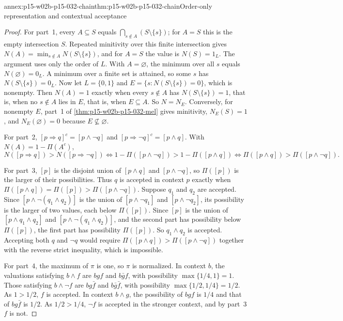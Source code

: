 \begin{annexitem}{annex:p15-w02b-p15-032-chain}{thm:p15-w02b-p15-032-chain}{Order-only representation and contextual acceptance}
\begin{proof}
For part~1, every \(A\subseteq S\) equals
\(\bigcap_{s\notin A}(S\setminus\{s\})\); for \(A=S\) this is the empty
intersection \(S\). Repeated minitivity over this finite intersection gives
\(N(A)=\min_{s\notin A}N(S\setminus\{s\})\), and for \(A=S\) the value is
\(N(S)=1_L\). The argument uses only the order of \(L\). With
\(A=\varnothing\), the minimum over all \(s\) equals \(N(\varnothing)=0_L\).
A minimum over a finite set is attained, so some \(s\) has
\(N(S\setminus\{s\})=0_L\). Now let \(L=\{0,1\}\) and
\(E=\{s:N(S\setminus\{s\})=0\}\), which is nonempty. Then \(N(A)=1\) exactly
when every \(s\notin A\) has \(N(S\setminus\{s\})=1\), that is, when no
\(s\notin A\) lies in \(E\), that is, when \(E\subseteq A\). So \(N=N_E\).
Conversely, for nonempty \(E\), part~1 of \cref{thm:p15-w02b-p15-032-mel}
gives minitivity, \(N_E(S)=1\), and \(N_E(\varnothing)=0\) because
\(E\not\subseteq\varnothing\).

For part~2, \([p\Rightarrow q]^c=[p\land\neg q]\) and
\([p\Rightarrow\neg q]^c=[p\land q]\). With \(N(A)=1-\Pi(A^c)\),
\[
 N([p\Rightarrow q])>N([p\Rightarrow\neg q])
 \iff 1-\Pi([p\land\neg q])>1-\Pi([p\land q])
 \iff \Pi([p\land q])>\Pi([p\land\neg q]).
\]

For part~3, \([p]\) is the disjoint union of \([p\land q]\) and
\([p\land\neg q]\), so \(\Pi([p])\) is the larger of their possibilities.
Thus \(q\) is accepted in context \(p\) exactly when
\(\Pi([p\land q])=\Pi([p])>\Pi([p\land\neg q])\). Suppose \(q_1\) and \(q_2\)
are accepted. Since \([p\land\neg(q_1\land q_2)]\) is the union of
\([p\land\neg q_1]\) and \([p\land\neg q_2]\), its possibility is the larger
of two values, each below \(\Pi([p])\). Since \([p]\) is the union of
\([p\land q_1\land q_2]\) and \([p\land\neg(q_1\land q_2)]\), and the second
part has possibility below \(\Pi([p])\), the first part has possibility
\(\Pi([p])\). So \(q_1\land q_2\) is accepted. Accepting both \(q\) and
\(\neg q\) would require \(\Pi([p\land q])>\Pi([p\land\neg q])\) together
with the reverse strict inequality, which is impossible.

For part~4, the maximum of \(\pi\) is one, so \(\pi\) is normalized. In
context \(b\), the valuations satisfying \(b\land f\) are \(bgf\) and
\(b\bar gf\), with possibility \(\max\{1/4,1\}=1\). Those satisfying
\(b\land\neg f\) are \(bg\bar f\) and \(b\bar g\bar f\), with possibility
\(\max\{1/2,1/4\}=1/2\). As \(1>1/2\), \(f\) is accepted. In context
\(b\land g\), the possibility of \(bgf\) is \(1/4\) and that of \(bg\bar f\)
is \(1/2\). As \(1/2>1/4\), \(\neg f\) is accepted in the stronger context,
and by part~3 \(f\) is not.
\end{proof}\end{annexitem}

